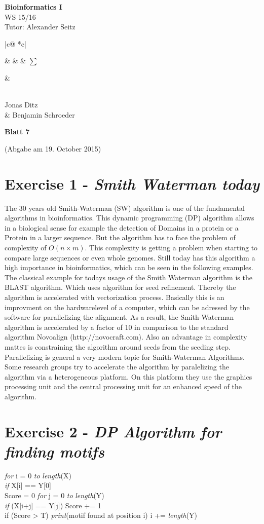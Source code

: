 \documentclass[%
   10pt,              %
   ngerman,           %
   a4paper,           %
   DIV11,             %
]{scrartcl}%
\makeatletter
\def\header#1#2#3#4#5#6#7{\pagestyle{empty}
\noindent
\begin{minipage}[t]{0.6\textwidth}
\begin{flushleft}
\textbf{#4}\\%
#6\\%
Tutor: #2  %
\end{flushleft}
\end{minipage}
\begin{minipage}[t]{0.4\textwidth}
\begin{flushright}
\points{#7}%
\vspace*{0.2cm}
#5%
\end{flushright}
\end{minipage}

\begin{center}
{\Large\textbf{ Blatt #1}} %

{(Abgabe am #3)} %
\end{center}
}
\newenvironment{vartab}[1]
{
    \begin{tabular}{ |c@{} *{#1}{c|} } %
}{
    \end{tabular}
}
\newcommand{\myformat}[1]{& #1}
\newcommand{\numbers}[1]{
  \newcounter{ctra}
\setcounter{ctra}{1}
\whiledo {\value{ctra} < #1}%
{%
  \myformat{\thectra}
  \stepcounter{ctra}%
}
\myformat{\thectra}
}
\newcommand{\emptyLine}[1]{
  \newcounter{ctra1}
\setcounter{ctra}{1}
\whiledo {\value{ctra1} < #1}%
{%
  \myformat{\hspace*{0.5cm}}
  \stepcounter{ctra1}%
}
}
\newcommand{\points}[1]{
\newcounter{colmns}
\setcounter{colmns}{#1}
\stepcounter{colmns}
  \begin{vartab}{\thecolmns}
    \numbers{#1} & $\sum$\\\hline
    \emptyLine{\thecolmns}\\
  \end{vartab}
}
\makeatother
\begin{document}
\header{7}{Alexander Seitz}{19. October 2015}{Bioinformatics I}{\\Jonas Ditz \\\& Benjamin Schroeder}{WS 15/16}{3}

  \section*{Exercise 1 - \textsl{Smith Waterman today}}
	  The 30 years old Smith-Waterman (SW) algorithm is one of the fundamental algorithms in bioinformatics. This dynamic programming (DP) algorithm allows in a biological sense for example the detection of Domains in a protein or a Protein in a larger sequence. But the algorithm has to face the problem of complexity of $O(n\times m)$. This complexity is getting a problem when starting to compare large sequences or even whole genomes. Still today has this algorithm a high importance in bioinformatics, which can be seen in the following examples.
	  The classical example for todays usage of the Smith Waterman algorithm is the BLAST algorithm. Which uses algorithm for seed refinement. Thereby the algorithm is accelerated with vectorization process. Basically this is an improvment on the hardwarelevel of a computer, which can be adressed by the software for parallelizing the alignment. As a result, the Smith-Waterman algorithm is accelerated by a factor of 10 in comparison to the standard algorithm Novoalign (http://novocraft.com). Also an advantage in complexity mattes is constraining the algorithm around seeds from the seeding step.
	   \cite{blast}
	  Parallelizing is general a very modern topic for Smith-Waterman Algorithms. Some research groups try to accelerate the algorithm by paralelizing the algorithm via a heterogeneous platform. On this platform they use the graphics processing unit and the central processing unit for an enhanced speed of the algorithm.
	  \cite{parallel}
	  
  \section*{Exercise 2 - \textsl{DP Algorithm for finding motifs}}
  \emph{for} i = 0 \emph{to} \emph{length}(X)\\
  \indent \emph{if} X[i] == Y[0]\\
  \indent \indent Score = 0
  \indent \indent \emph{for} j = 0 \emph{to} \emph{length}(Y)\\
  \indent \indent \indent \emph{if} (X[i+j] == Y[j]) Score += 1\\
  \indent \indent if (Score > T) 
  \indent \indent \indent \emph{print}(motif found at position i)
  \indent \indent \indent i += \emph{length}(Y)
 
\end{document}
